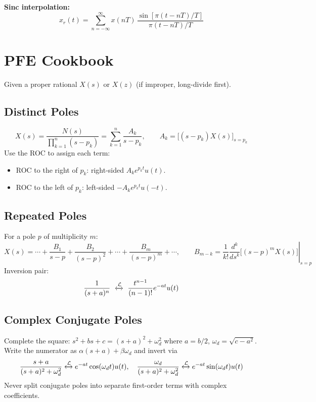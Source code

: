 \documentclass[10pt]{article}
\newcommand{\ltrans}{\xleftrightarrow{\mathcal{L}}}
\begin{document}
\textbf{Sinc interpolation:}
\[
x_r(t) = \sum_{n=-\infty}^{\infty} x(nT)\,\frac{\sin[\pi(t - nT)/T]}{\pi(t - nT)/T}
\]

\section{PFE Cookbook}\label{sec:pfe}

Given a proper rational $X(s)$ or $X(z)$ (if improper, long-divide first).

\subsection{Distinct Poles}
\[
X(s) = \frac{N(s)}{\prod_{k=1}^n (s - p_k)} = \sum_{k=1}^{n}\frac{A_k}{s - p_k},\qquad
A_k = \bigl[(s - p_k)X(s)\bigr]_{s = p_k}
\]
Use the ROC to assign each term:
\begin{itemize}\setlength\itemsep{-2pt}
\item ROC to the right of $p_k$: right-sided $A_k e^{p_k t}u(t)$.
\item ROC to the left of $p_k$: left-sided $-A_k e^{p_k t}u(-t)$.
\end{itemize}

\subsection{Repeated Poles}
For a pole $p$ of multiplicity $m$:
\[
X(s) = \cdots + \frac{B_1}{s - p} + \frac{B_2}{(s - p)^2} + \cdots + \frac{B_m}{(s - p)^m} + \cdots,\qquad
B_{m - k} = \frac{1}{k!}\left.\frac{d^k}{ds^k}\bigl[(s - p)^m X(s)\bigr]\right|_{s = p}
\]
Inversion pair:
\[
\frac{1}{(s + a)^n}\ \ltrans\ \frac{t^{n-1}}{(n-1)!}e^{-at}u(t)
\]

\subsection{Complex Conjugate Poles}
Complete the square: $s^2 + bs + c = (s + a)^2 + \omega_d^2$ where $a = b/2$, $\omega_d = \sqrt{c - a^2}$. Write the numerator as $\alpha(s + a) + \beta\omega_d$ and invert via
\[
\frac{s + a}{(s + a)^2 + \omega_d^2}\ltrans e^{-at}\cos(\omega_d t)u(t),\quad
\frac{\omega_d}{(s + a)^2 + \omega_d^2}\ltrans e^{-at}\sin(\omega_d t)u(t)
\]
Never split conjugate poles into separate first-order terms with complex coefficients.
\end{document}
